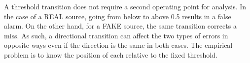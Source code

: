 A threshold transition does not require a second operating point for analysis. In the case of a REAL source, going from below to above 0.5 results in a false alarm. On the other hand, for a FAKE source, the same transition corrects a miss. As such, a directional transition can affect the two types of errors in opposite ways even if the direction is the same in both cases. The empirical problem is to know the position of each relative to the fixed threshold.
